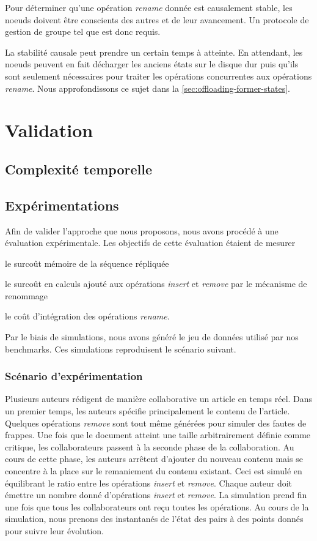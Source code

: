 \documentclass[12pt]{thesul}
\begin{document}
Pour déterminer qu'une opération \emph{rename} donnée est causalement stable, les noeuds doivent être conscients des autres et de leur avancement.
Un protocole de gestion de groupe tel que \cite{swim2002,lifeguard2018} est donc requis.

La stabilité causale peut prendre un certain temps à atteinte.
En attendant, les noeuds peuvent en fait décharger les anciens états sur le disque dur puis qu'ils sont seulement nécessaires pour traiter les opérations concurrentes aux opérations \emph{rename}.
Nous approfondissons ce sujet dans la \autoref{sec:offloading-former-states}.

\section{Validation}
\subsection{Complexité temporelle}
\subsection{Expérimentations}

Afin de valider l'approche que nous proposons, nous avons procédé à une évaluation expérimentale.
Les objectifs de cette évaluation étaient de mesurer
\begin{enumerate*}[label=(\roman*)]
  \item le surcoût mémoire de la séquence répliquée
  \item le surcoût en calculs ajouté aux opérations \emph{insert} et \emph{remove} par le mécanisme de renommage
  \item le coût d'intégration des opérations \emph{rename}.
\end{enumerate*}

Par le biais de simulations, nous avons généré le jeu de données utilisé par nos benchmarks.
Ces simulations reproduisent le scénario suivant.

\subsubsection{Scénario d'expérimentation}

Plusieurs auteurs rédigent de manière collaborative un article en temps réel.
Dans un premier temps, les auteurs spécifie principalement le contenu de l'article.
Quelques opérations \emph{remove} sont tout même générées pour simuler des fautes de frappes.
Une fois que le document atteint une taille arbitrairement définie comme critique, les collaborateurs passent à la seconde phase de la collaboration.
Au cours de cette phase, les auteurs arrêtent d'ajouter du nouveau contenu mais se concentre à la place sur le remaniement du contenu existant.
Ceci est simulé en équilibrant le ratio entre les opérations \emph{insert} et \emph{remove}.
Chaque auteur doit émettre un nombre donné d'opérations \emph{insert} et \emph{remove}.
La simulation prend fin une fois que tous les collaborateurs ont reçu toutes les opérations.
Au cours de la simulation, nous prenons des instantanés de l'état des pairs à des points donnés pour suivre leur évolution.
\end{document}
